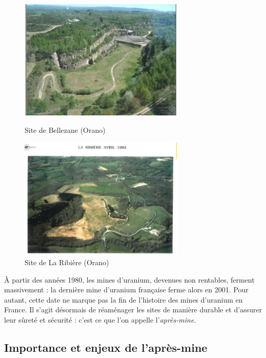 \documentclass{article}
\begin{document}
\begin{figure}[H]
    \centering
    \begin{minipage}{0.5\textwidth}
        \centering
        \includegraphics[width=0.7\textwidth]{I_A_3.jpg} 
        \caption{Site de Bellezane (Orano)}
        \label{fig:bellezane1}
    \end{minipage}\hfill
    \begin{minipage}{0.5\textwidth}
        \centering
        \includegraphics[width=0.7\textwidth]{I_A_4.jpg} 
        \caption{Site de La Ribière (Orano)}
        \label{fig:ribiere1}
    \end{minipage}
\end{figure}


À partir des années 1980, les mines d’uranium, devenues non rentables, ferment massivement : la dernière mine d’uranium française ferme alors en 2001. Pour autant, cette date ne marque pas la fin de l’histoire des mines d’uranium en France. Il s’agit désormais de réaménager les sites de manière durable et d'assurer leur sûreté et sécurité : c’est ce que l’on appelle l’\emph{après-mine}.


\subsection{Importance et enjeux de l'après-mine}
\end{document}
